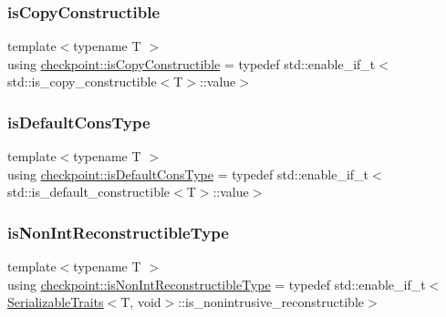 \mbox{\label{namespacecheckpoint_a60a9850fa59d4b236b2f888baf135a95}} 
\subsubsection{\texorpdfstring{is\+Copy\+Constructible}{isCopyConstructible}}
{\footnotesize\ttfamily template$<$typename T $>$ \\
using \hyperlink{namespacecheckpoint_a60a9850fa59d4b236b2f888baf135a95}{checkpoint\+::is\+Copy\+Constructible} = typedef std\+::enable\+\_\+if\+\_\+t$<$std\+::is\+\_\+copy\+\_\+constructible$<$T$>$\+::value$>$}

\mbox{\label{namespacecheckpoint_a58224a3b056d9e2aa73d563871981a7d}} 
\subsubsection{\texorpdfstring{is\+Default\+Cons\+Type}{isDefaultConsType}}
{\footnotesize\ttfamily template$<$typename T $>$ \\
using \hyperlink{namespacecheckpoint_a58224a3b056d9e2aa73d563871981a7d}{checkpoint\+::is\+Default\+Cons\+Type} = typedef std\+::enable\+\_\+if\+\_\+t$<$std\+::is\+\_\+default\+\_\+constructible$<$T$>$\+::value$>$}

\mbox{\label{namespacecheckpoint_a46b7909fb0fef92b4787567fde7c760b}} 
\subsubsection{\texorpdfstring{is\+Non\+Int\+Reconstructible\+Type}{isNonIntReconstructibleType}}
{\footnotesize\ttfamily template$<$typename T $>$ \\
using \hyperlink{namespacecheckpoint_a46b7909fb0fef92b4787567fde7c760b}{checkpoint\+::is\+Non\+Int\+Reconstructible\+Type} = typedef std\+::enable\+\_\+if\+\_\+t$<$ \hyperlink{structcheckpoint_1_1_serializable_traits}{Serializable\+Traits}$<$T, void$>$\+::is\+\_\+nonintrusive\+\_\+reconstructible$>$}

